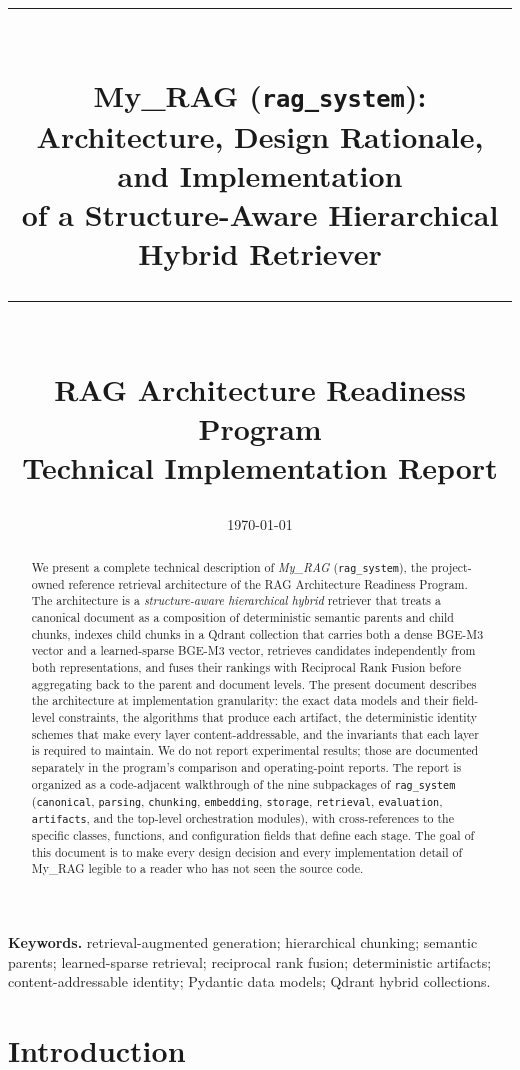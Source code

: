 \documentclass[11pt,a4paper]{article}
\title{
  \vspace{-1.5cm}
  \rule{\linewidth}{0.4pt}\\[0.3cm]
  {\Large\bfseries My\_RAG (\texttt{rag\_system}):}\\[0.15cm]
  {\large Architecture, Design Rationale, and Implementation\\ of a Structure-Aware Hierarchical Hybrid Retriever}\\[0.2cm]
  \rule{\linewidth}{0.4pt}\\[0.4cm]
  \normalsize RAG Architecture Readiness Program\\
  \small Technical Implementation Report
}
\author{}
\date{\today}
\begin{document}
\maketitle
\thispagestyle{empty}

\begin{abstract}
\noindent
We present a complete technical description of \emph{My\_RAG}
(\texttt{rag\_system}), the project-owned reference retrieval
architecture of the RAG Architecture Readiness Program. The
architecture is a \emph{structure-aware hierarchical hybrid} retriever
that treats a canonical document as a composition of deterministic
semantic parents and child chunks, indexes child chunks in a Qdrant
collection that carries both a dense BGE-M3 vector and a learned-sparse
BGE-M3 vector, retrieves candidates independently from both
representations, and fuses their rankings with Reciprocal Rank Fusion
before aggregating back to the parent and document levels. The present
document describes the architecture at implementation granularity: the
exact data models and their field-level constraints, the algorithms
that produce each artifact, the deterministic identity schemes that
make every layer content-addressable, and the invariants that each
layer is required to maintain. We do not report experimental results;
those are documented separately in the program's comparison and
operating-point reports. The report is organized as a code-adjacent
walkthrough of the nine subpackages of \texttt{rag\_system}
(\texttt{canonical}, \texttt{parsing}, \texttt{chunking},
\texttt{embedding}, \texttt{storage}, \texttt{retrieval},
\texttt{evaluation}, \texttt{artifacts}, and the top-level
orchestration modules), with cross-references to the specific
classes, functions, and configuration fields that define each stage.
The goal of this document is to make every design decision and every
implementation detail of My\_RAG legible to a reader who has not
seen the source code.
\end{abstract}

\vfill
\noindent\textbf{Keywords.} retrieval-augmented generation;
hierarchical chunking; semantic parents; learned-sparse retrieval;
reciprocal rank fusion; deterministic artifacts; content-addressable
identity; Pydantic data models; Qdrant hybrid collections.

\newpage
\tableofcontents
\newpage

\section{Introduction}\label{sec:intro}
\end{document}
